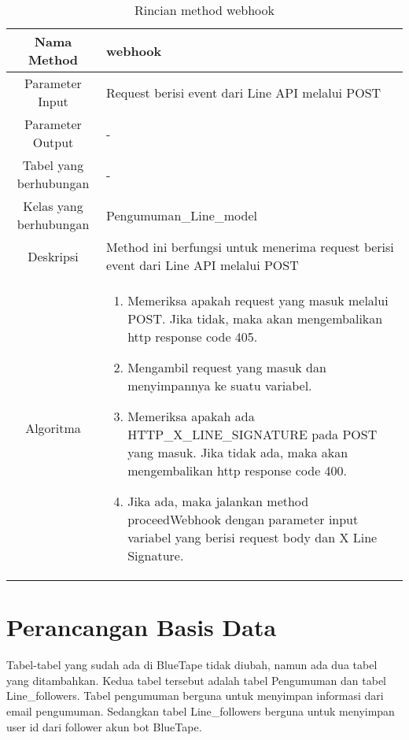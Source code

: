 \begin{center}
	\begin{table}[H]
	\caption{Rincian method webhook}
	\label{table:pengumumanline-webhook}
\begin{tabular}{|c|p{11cm}|}
\hline
Nama Method 	& 	 webhook	\\
\hline
Parameter Input & Request berisi event dari Line API melalui POST \\
\hline
Parameter Output & - \\
\hline
Tabel yang berhubungan & -\\
\hline
Kelas yang berhubungan & Pengumuman\_Line\_model \\
\hline
Deskripsi	& Method ini berfungsi untuk menerima request berisi event dari Line API melalui POST\\
\hline
Algoritma	& \begin{enumerate}
				\item Memeriksa apakah request yang masuk melalui POST. Jika tidak, maka akan mengembalikan http response code 405.
				\item Mengambil request yang masuk dan menyimpannya ke suatu variabel.
				\item Memeriksa apakah ada HTTP\_X\_LINE\_SIGNATURE pada POST yang masuk. Jika tidak ada, maka akan mengembalikan http response code 400.
				\item Jika ada, maka jalankan method proceedWebhook dengan parameter input variabel yang berisi request body dan X Line Signature.
				\end{enumerate} \\
\hline
\end{tabular}
\end{table}
\end{center}

\section{Perancangan Basis Data}
Tabel-tabel yang sudah ada di BlueTape tidak diubah, namun ada dua tabel yang ditambahkan. Kedua tabel tersebut adalah tabel Pengumuman dan tabel Line\_followers. Tabel pengumuman berguna untuk menyimpan informasi dari email pengumuman. Sedangkan tabel Line\_followers berguna untuk menyimpan user id dari follower akun bot BlueTape.

